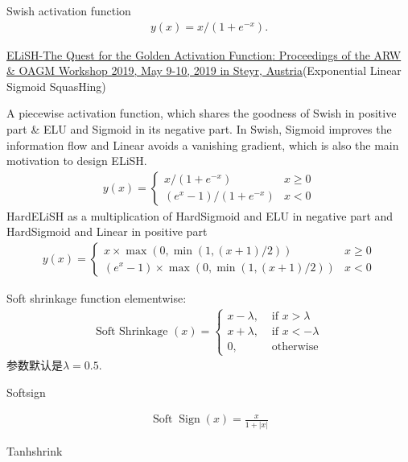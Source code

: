 Swish activation function \cite{Ramachandran2018}
\begin{align}
    y(x)=x /\left(1+e^{-x}\right).
\end{align}

\href{https://arxiv.org/pdf/1808.00783.pdf}{ELiSH-\href{https://workshops.aapr.at/wp-content/uploads/2019/05/ARW-OAGM19_41.pdf}{The Quest for the Golden Activation Function}: Proceedings of the ARW \& OAGM Workshop 2019, May 9-10, 2019 in Steyr, Austria}(Exponential Linear Sigmoid SquasHing)

A piecewise activation function, which shares the goodness of Swish in positive part \& ELU and Sigmoid in its negative part.
In Swish, Sigmoid improves the information flow and Linear avoids a vanishing gradient, which is also the main motivation to design ELiSH.
\begin{align}
    y(x)=\left\{\begin{array}{ll}
    x /\left(1+e^{-x}\right) & x \geq 0 \\
    \left(e^{x}-1\right) /\left(1+e^{-x}\right) & x<0
    \end{array}\right.
\end{align}
HardELiSH as a multiplication of HardSigmoid and ELU in negative part and HardSigmoid and Linear in positive part
\begin{align}
    y(x)=\left\{\begin{array}{ll}
    x \times \max (0, \min (1,(x+1) / 2)) & x \geq 0 \\
    \left(e^{x}-1\right) \times \max (0, \min (1,(x+1) / 2)) & x<0
    \end{array}\right.
\end{align}

Soft shrinkage function elementwise:
\begin{align}
\text { Soft Shrinkage }(x)=\left\{\begin{array}{ll}
{x-\lambda,} & {\text { if } x>\lambda} \\
{x+\lambda,} & {\text { if } x<-\lambda} \\
{0,} & {\text { otherwise }}
\end{array}\right.
\end{align}
参数默认是$\lambda=0.5$.

Softsign

\begin{align}
  \operatorname{Soft} \operatorname{Sign}(x)=\frac{x}{1+|x|}
\end{align}

Tanhshrink

